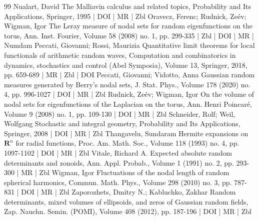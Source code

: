 \documentclass[10pt]{amsart}
\theoremstyle{definition}\newtheorem{defi}[theo]{Definition}\newtheorem{rema}[theo]{Remark}\newtheorem{exam}[theo]{Example}\newtheorem{exem}[theo]{Example}\newtheorem{nota}[theo]{Notation}
\begin{document}
\begin{thebibliography}{99}
 Nualart, David The Malliavin calculus and related topics, Probability and Its Applications, Springer, 1995 | DOI | MR | Zbl
 Oravecz, Ferenc; Rudnick, Zeév; Wigman, Igor The Leray measure of nodal sets for random eigenfunctions on the torus, Ann. Inst. Fourier, Volume 58 (2008) no. 1, pp. 299-335 | Zbl | DOI | MR | Numdam
 Peccati, Giovanni; Rossi, Maurizia Quantitative limit theorems for local functionals of arithmetic random waves, Computation and combinatorics in dynamics, stochastics and control (Abel Symposia), Volume 13, Springer, 2018, pp. 659-689 | MR | Zbl | DOI
 Peccati, Giovanni; Vidotto, Anna Gaussian random measures generated by Berry’s nodal sets, J. Stat. Phys., Volume 178 (2020) no. 4, pp. 996-1027 | DOI | MR | Zbl
 Rudnick, Zeév; Wigman, Igor On the volume of nodal sets for eigenfunctions of the Laplacian on the torus, Ann. Henri Poincaré, Volume 9 (2008) no. 1, pp. 109-130 | DOI | MR | Zbl
 Schneider, Rolf; Weil, Wolfgang Stochastic and integral geometry, Probability and Its Applications, Springer, 2008 | DOI | MR | Zbl
 Thangavelu, Sundaram Hermite expansions on ${\mathbf{R}}^n$ for radial functions, Proc. Am. Math. Soc., Volume 118 (1993) no. 4, pp. 1097-1102 | DOI | MR | Zbl
 Vitale, Richard A. Expected absolute random determinants and zonoids, Ann. Appl. Probab., Volume 1 (1991) no. 2, pp. 293-300 | MR | Zbl
 Wigman, Igor Fluctuations of the nodal length of random spherical harmonics, Commun. Math. Phys., Volume 298 (2010) no. 3, pp. 787-831 | DOI | MR | Zbl
 Zaporozhets, Dmitry N.; Kabluchko, Zakhar Random determinants, mixed volumes of ellipsoids, and zeros of Gaussian random fields, Zap. Nauchn. Semin. (POMI), Volume 408 (2012), pp. 187-196 | DOI | MR | Zbl
\end{thebibliography}
\end{document}
